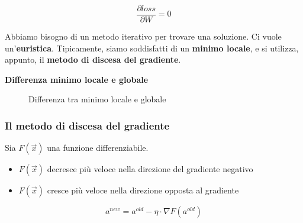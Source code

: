 \begin{equation}
    \frac{\partial loss}{\partial W} = 0
\end{equation}

Abbiamo bisogno di un metodo iterativo per trovare una soluzione. Ci vuole
un'\textbf{euristica}. Tipicamente, siamo soddisfatti di un \textbf{minimo
    locale}, e si utilizza, appunto, il \textbf{metodo di discesa del gradiente}.

\textbf{Differenza minimo locale e globale}

\begin{figure}[H]
    \begin{center}

        \caption{Differenza tra minimo locale e globale}
    \end{center}

\end{figure}

\subsubsection{Il metodo di discesa del gradiente}
Sia $F(\vec{x})$ una funzione differenziabile.
\begin{itemize}
    \item $F(\vec{x})$ decresce più veloce nella direzione del gradiente negativo
    \item $F(\vec{x})$ cresce più veloce nella direzione opposta al gradiente
\end{itemize}

\begin{equation}
    a^{new} = a^{old} - \eta \cdot \nabla F(a^{old})
\end{equation}

